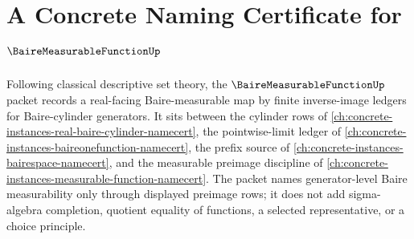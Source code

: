 \chapter{A Concrete Naming Certificate for $\BaireMeasurableFunctionUp$}
\label{ch:concrete-instances-baire-measurable-function-namecert}

Following classical descriptive set theory, the $\BaireMeasurableFunctionUp$ packet records a real-facing Baire-measurable map by finite inverse-image ledgers for Baire-cylinder generators. It sits between the cylinder rows of \autoref{ch:concrete-instances-real-baire-cylinder-namecert}, the pointwise-limit ledger of \autoref{ch:concrete-instances-baireonefunction-namecert}, the prefix source of \autoref{ch:concrete-instances-bairespace-namecert}, and the measurable preimage discipline of \autoref{ch:concrete-instances-measurable-function-namecert}. The packet names generator-level Baire measurability only through displayed preimage rows; it does not add sigma-algebra completion, quotient equality of functions, a selected representative, or a choice principle.

